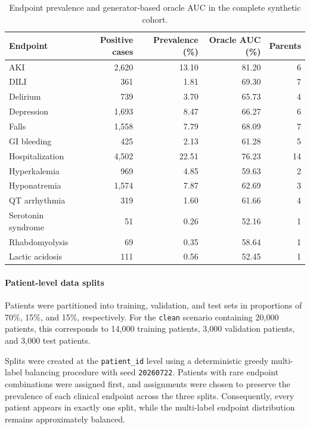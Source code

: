 \begin{table}[H]
    \centering
    \small
    \caption{Endpoint prevalence and generator-based oracle AUC in the complete synthetic cohort.}
    \label{tab:app_endpoints}
    \begin{tabular}{lrrrr}
        \toprule
        \textbf{Endpoint} &
        \textbf{Positive cases} &
        \textbf{Prevalence (\%)} &
        \textbf{Oracle AUC (\%)} &
        \textbf{Parents} \\
        \midrule
        AKI                 & 2{,}620 & 13.10 & 81.20 & 6 \\
        DILI                & 361     & 1.81  & 69.30 & 7 \\
        Delirium            & 739     & 3.70  & 65.73 & 4 \\
        Depression          & 1{,}693 & 8.47  & 66.27 & 6 \\
        Falls               & 1{,}558 & 7.79  & 68.09 & 7 \\
        GI bleeding         & 425     & 2.13  & 61.28 & 5 \\
        Hospitalization     & 4{,}502 & 22.51 & 76.23 & 14 \\
        Hyperkalemia        & 969     & 4.85  & 59.63 & 2 \\
        Hyponatremia        & 1{,}574 & 7.87  & 62.69 & 3 \\
        QT arrhythmia       & 319     & 1.60  & 61.66 & 4 \\
        Serotonin syndrome  & 51      & 0.26  & 52.16 & 1 \\
        Rhabdomyolysis      & 69      & 0.35  & 58.64 & 1 \\
        Lactic acidosis     & 111     & 0.56  & 52.45 & 1 \\
        \bottomrule
    \end{tabular}
\end{table}

\paragraph{Patient-level data splits}

Patients were partitioned into training, validation, and
test sets in proportions of 70\%, 15\%, and 15\%, respectively. For the
\texttt{clean} scenario containing 20{,}000 patients, this corresponds to
14{,}000 training patients, 3{,}000 validation patients, and 3{,}000 test
patients.

Splits were created at the \texttt{patient\_id} level using a deterministic
greedy multi-label balancing procedure with seed \texttt{20260722}. Patients
with rare endpoint combinations were assigned first, and assignments were
chosen to preserve the prevalence of each clinical endpoint across the three
splits. Consequently, every patient appears in exactly one split, while the
multi-label endpoint distribution remains approximately balanced.

